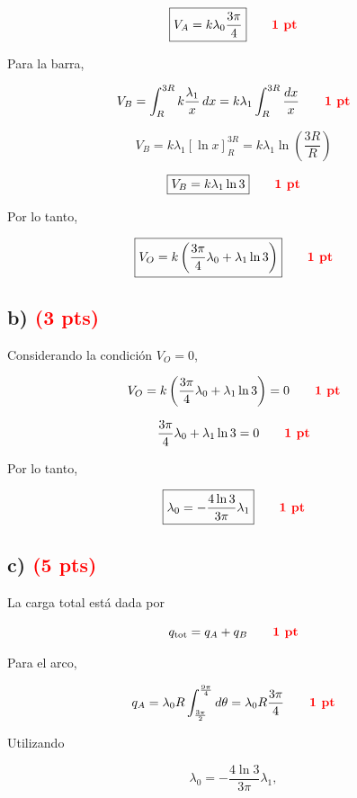 \documentclass[12pt]{article}
\begin{document}
\[
\boxed{
V_A
=
k\lambda_0\frac{3\pi}{4}
}
\qquad
\textcolor{red}{\textbf{1 pt}}
\]

Para la barra,

\[
V_B
=
\int_R^{3R}
k\frac{\lambda_1}{x}\,dx
=
k\lambda_1
\int_R^{3R}\frac{dx}{x}
\qquad
\textcolor{red}{\textbf{1 pt}}
\]

\[
V_B
=
k\lambda_1
\left[
\ln x
\right]_R^{3R}
=
k\lambda_1
\ln\left(\frac{3R}{R}\right)
\]

\[
\boxed{
V_B=k\lambda_1\ln3
}
\qquad
\textcolor{red}{\textbf{1 pt}}
\]

Por lo tanto,

\[
\boxed{
V_O
=
k\left(
\frac{3\pi}{4}\lambda_0+\lambda_1\ln3
\right)
}
\qquad
\textcolor{red}{\textbf{1 pt}}
\]


\subsection*{b) \hfill \textcolor{red}{\textbf{(3 pts)}}}

Considerando la condición $V_O=0$,

\[
V_O
=
k\left(
\frac{3\pi}{4}\lambda_0+\lambda_1\ln3
\right)
=
0
\qquad
\textcolor{red}{\textbf{1 pt}}
\]

\[
\frac{3\pi}{4}\lambda_0+\lambda_1\ln3=0
\qquad
\textcolor{red}{\textbf{1 pt}}
\]

Por lo tanto,

\[
\boxed{
\lambda_0
=
-\frac{4\ln3}{3\pi}\lambda_1
}
\qquad
\textcolor{red}{\textbf{1 pt}}
\]


\subsection*{c) \hfill \textcolor{red}{\textbf{(5 pts)}}}

La carga total está dada por

\[
q_{\text{tot}}
=
q_A+q_B
\qquad
\textcolor{red}{\textbf{1 pt}}
\]

Para el arco,

\[
q_A
=
\lambda_0R
\int_{\frac{3\pi}{2}}^{\frac{9\pi}{4}}d\theta
=
\lambda_0R\frac{3\pi}{4}
\qquad
\textcolor{red}{\textbf{1 pt}}
\]

Utilizando

\[
\lambda_0
=
-\frac{4\ln3}{3\pi}\lambda_1,
\]
\end{document}
